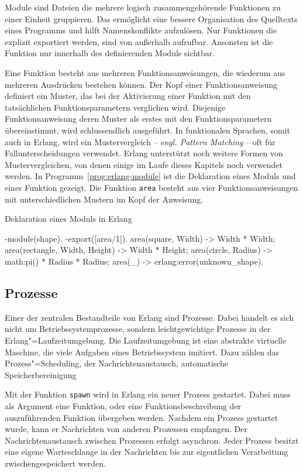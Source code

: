 Module sind Dateien die mehrere logisch zusammengehörende Funktionen zu einer Einheit gruppieren. Das ermöglicht eine bessere Organisation des Quelltexts eines Programms und hilft Namenskonflikte aufzulösen. Nur Funktionen die explizit exportiert werden, sind von außerhalb aufrufbar. Ansonsten ist die Funktion nur innerhalb des definierenden Moduls sichtbar.

Eine Funktion besteht aus mehreren Funktionsanweisungen, die wiederum aus mehreren Ausdrücken bestehen können. Der Kopf einer Funktionsanweisung definiert ein Muster, das bei der Aktivierung einer Funktion mit den tatsächlichen Funktionsparametern verglichen wird. Diejenige Funktionsanweisung deren Muster als erstes mit den Funktionsparametern übereinstimmt, wird schlussendlich ausgeführt. In funktionalen Sprachen, somit auch in Erlang, wird ein Mustervergleich -- \textit{engl. Pattern Matching} -- oft für Fallunterscheidungen verwendet. Erlang unterstützt noch weitere Formen von Mustervergleichen, von denen einige im Laufe dieses Kapitels noch verwendet werden. In Programm~\ref{prog:erlang-module} ist die Deklaration eines Moduls und einer Funktion gezeigt. Die Funktion \lstinline{area} besteht aus vier Funktionsanweisungen mit unterschiedlichen Mustern im Kopf der Anweisung.

\begin{program}[!hbt]
\caption{Deklaration eines Moduls in Erlang}
\label{prog:erlang-module}
\begin{ErlangCode}
-module(shape).
-export([area/1]).
area({square, Width}) -> Width * Width;
area({rectangle, Width, Height}) -> Width * Height;
area({circle, Radius}) -> math:pi() * Radius * Radius;
area(_) -> erlang:error(unknown_shape).
\end{ErlangCode}
\end{program}

\subsection{Prozesse}
\label{subsec:erlang-processes}

Einer der zentralen Bestandteile von Erlang sind Prozesse. Dabei handelt es sich nicht um Betriebssystemprozesse, sondern leichtgewichtige Prozesse in der Erlang"=Laufzeitumgebung. Die Laufzeitumgebung ist eine abstrakte virtuelle Maschine, die viele Aufgaben eines Betriebssystem imitiert. Dazu zählen das Prozess"=Scheduling, der Nachrichtenaustausch, automatische Speicherbereinigung \usw

Mit der Funktion \lstinline{spawn} wird in Erlang ein neuer Prozess gestartet. Dabei muss als Argument eine Funktion, oder eine Funktionsbeschreibung der auszuführenden Funktion übergeben werden. Nachdem ein Prozess gestartet wurde, kann er Nachrichten von anderen Prozessen empfangen. Der Nachrichtenaustausch zwischen Prozessen erfolgt asynchron. Jeder Prozess besitzt eine eigene Warteschlange in der Nachrichten bis zur eigentlichen Verarbeitung zwischengespeichert werden.

